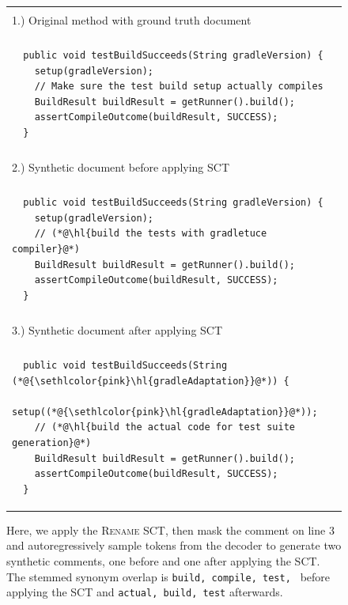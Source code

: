 \documentclass[usenames,dvipsnames]{article} %
\DeclareRobustCommand{\hlred}[1]{{\sethlcolor{pink}\hl{#1}}}
\begin{document}
  \begin{figure}[H]
    \begin{center}
      \begin{tabular}{|p{9cm}|}
        \hline\\[-1em]1.) Original method with ground truth document \\[-1em]\\\hline
        \begin{lstlisting}
  public void testBuildSucceeds(String gradleVersion) {
    setup(gradleVersion);
    // Make sure the test build setup actually compiles
    BuildResult buildResult = getRunner().build();
    assertCompileOutcome(buildResult, SUCCESS);
  }
        \end{lstlisting}
        \\\hline\\[-1em]2.) Synthetic document before applying SCT \\[-1em]\\\hline
        \begin{lstlisting}
  public void testBuildSucceeds(String gradleVersion) {
    setup(gradleVersion);
    // (*@\hl{build the tests with gradletuce compiler}@*)
    BuildResult buildResult = getRunner().build();
    assertCompileOutcome(buildResult, SUCCESS);
  }
        \end{lstlisting}
        \\\hline\\[-1em]3.) Synthetic document after applying SCT \\[-1em]\\\hline
        \begin{lstlisting}
  public void testBuildSucceeds(String (*@\hlred{gradleAdaptation}@*)) {
    setup((*@\hlred{gradleAdaptation}@*));
    // (*@\hl{build the actual code for test suite generation}@*)
    BuildResult buildResult = getRunner().build();
    assertCompileOutcome(buildResult, SUCCESS);
  }
        \end{lstlisting}\\\hline
      \end{tabular}
    \end{center}
    \caption{Here, we apply the \textsc{Rename} SCT, then mask the comment on line 3 and autoregressively sample tokens from the decoder to generate two synthetic comments, one before and one after applying the SCT. The stemmed synonym overlap is \texttt{build, compile, test, } before applying the SCT and \texttt{actual, build, test} afterwards.}
    \label{fig:document_synthesis}
  \end{figure}
\end{document}
